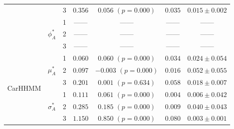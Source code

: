 \documentclass{article}
\begin{document}
\begin{center}
{\begin{tabular}{ccccccc}
                            &                               & 3                                & $0.356$                         & $0.056$ $(p=0.000)$          & $0.035$                             & $0.015 \pm 0.002$                             \\
                            & \multirow{3}{*}{$\phi_A^*$}   & 1                                & ------                         & ------                     & ------                             & ------                                      \\
                            &                               & 2                                & ------                         & ------                     & ------                             & ------                                      \\
                            &                               & 3                                & ------                         & ------                     & ------                             & ------                                      \\ \hline
\multirow{9}{*}{CarHHMM}    & \multirow{3}{*}{$\mu_A^*$}    & 1                                & $0.060$                         & $0.060$ $(p=0.000)$          & $0.034$                             & $0.024 \pm 0.054$                             \\
                            &                               & 2                                & $0.097$                         & $-0.003$ $(p=0.000)$          & $0.016$                             & $0.052 \pm 0.055$                             \\
                            &                               & 3                                & $0.201$                         & $0.001$ $(p=0.634)$          & $0.058$                             & $0.018 \pm 0.007$                             \\
                            & \multirow{3}{*}{$\sigma_A^*$} & 1                                & $0.111$                         & $0.061$ $(p=0.000)$          & $0.004$                             & $0.006 \pm 0.042$                             \\
                            &                               & 2                                & $0.285$                         & $0.185$ $(p=0.000)$          & $0.009$                             & $0.040 \pm 0.043$                             \\ 
                            &                               & 3                                & $1.150$                         & $0.850$ $(p=0.000)$          & $0.080$                             & $0.003 \pm 0.001$                             \\

\end{tabular}}
\end{center}
\end{document}
